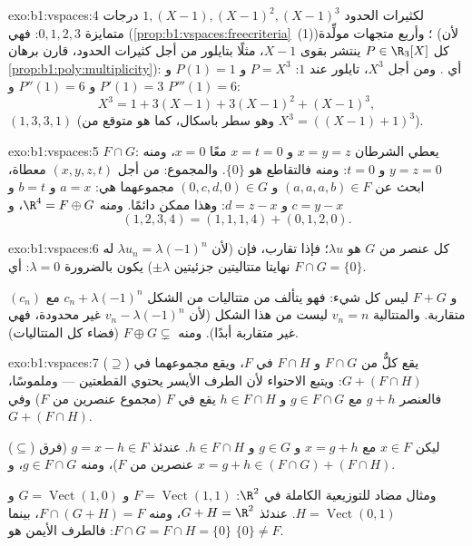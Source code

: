 \begin{solution}{exo:b1:vspaces:4}
لكثيرات الحدود $1, (X-1), (X-1)^2, (X-1)^3$ درجات متمايزة $0,
1, 2, 3$: فهي  (\cref{prop:b1:vspaces:freecriteria}~(1))؛ وأربع
متجهات  مولِّدة (لأن كل $P \in \R_3[X]$ ينتشر بقوى $X -
1$، مثلًا بتايلور من أجل كثيرات الحدود، قارن برهان
\cref{prop:b1:poly:multiplicity}): أي . ومن أجل $X^3$، تايلور عند
$1$: $P = X^3$ و $P(1) = 1$ و $P'(1) = 3$ و $P''(1) = 6$ و $P'''(1) =
6$:
\[
X^3 = 1 + 3(X - 1) + 3(X-1)^2 + (X-1)^3 ,
\]
 $(1, 3, 3, 1)$ (وهو سطر باسكال، كما هو متوقع من $X^3 =
((X-1)+1)^3$).
\end{solution}

\begin{solution}{exo:b1:vspaces:5}
$F \cap G$: يعطي الشرطان $x = y = z$ و $x = t = 0$ معًا
$x = 0$، ومنه $y = z = 0$ و $t = 0$: ومنه فالتقاطع هو
$\{0\}$. والمجموع: من أجل $(x,y,z,t)$ معطاة، ابحث عن $(a,a,a,b) \in F$ و
$(0,c,d,0) \in G$ مجموعهما هي: $a = x$ و $b = t$ و $c = y - x$ و $d =
z - x$: وهذا ممكن دائمًا. ومنه $\R^4 = F \oplus G$، و
\[
(1,2,3,4) = (1,1,1,4) + (0,1,2,0) .
\]
\end{solution}

\begin{solution}{exo:b1:vspaces:6}
كل عنصر من $G$ هو $\lambda u$؛ فإذا تقارب، فإن (لأن
$\lambda u_n = \lambda(-1)^n$ له نهايتا متتاليتين جزئيتين $\pm
\lambda$) يكون بالضرورة $\lambda = 0$: أي $F \cap G = \{0\}$.

و $F + G$ ليس كل شيء: فهو يتألف من متتاليات من الشكل
$c_n + \lambda(-1)^n$ مع $(c_n)$ متقاربة. والمتتالية $v_n =
n$ ليست من هذا الشكل (لأن $v_n - \lambda(-1)^n$ غير محدودة، فهي غير
متقاربة أبدًا). ومنه $F \oplus G \subsetneq$ (فضاء كل المتتاليات).
\end{solution}

\begin{solution}{exo:b1:vspaces:7}
($\supseteq$) يقع كلٌّ من $F \cap G$ و $F \cap H$ في $F$، ويقع
مجموعهما في $G + (F \cap H)$: ويتبع الاحتواء لأن الطرف الأيسر
 يحتوي القطعتين --- وملموسًا، فالعنصر $g +
h$ مع $g \in F\cap G$ و $h \in F \cap H$ يقع في $F$ (مجموع عنصرين
من $F$) وفي $G + (F \cap H)$.

($\subseteq$) ليكن $x \in F$ مع $x = g + h$ و $g \in G$ و $h \in F
\cap H$. عندئذ $g = x - h \in F$ (فرق عنصرين من $F$)، ومنه
$g \in F \cap G$، و $x = g + h \in (F \cap G) + (F \cap H)$.

ومثال مضاد للتوزيعية الكاملة في $\R^2$: $F =
\operatorname{Vect}(1,1)$ و $G = \operatorname{Vect}(1,0)$ و $H =
\operatorname{Vect}(0,1)$. عندئذ $G + H = \R^2$، ومنه $F \cap (G+H) =
F$، بينما $F \cap G = F \cap H = \{0\}$: فالطرف الأيمن هو $\{0\}
\neq F$.
\end{solution}

